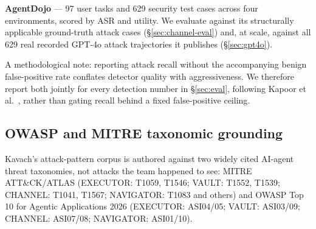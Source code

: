 \textbf{AgentDojo} \cite{debenedetti2024agentdojo} --- 97 user tasks and
629 security test cases across four environments, scored by ASR and
utility. We evaluate against its structurally applicable ground-truth
attack cases (\S\ref{sec:channel-eval}) and, at scale, against all 629 real
recorded GPT-4o attack trajectories it publishes (\S\ref{sec:gpt4o}).

A methodological note: reporting attack recall without the accompanying
benign false-positive rate conflates detector quality with aggressiveness.
We therefore report both jointly for every detection number in
\S\ref{sec:eval}, following Kapoor et al.~\cite{kapoor2024aiagents}, rather
than gating recall behind a fixed false-positive ceiling.

\subsection{OWASP and MITRE taxonomic grounding}

Kavach's attack-pattern corpus is authored against two widely cited
AI-agent threat taxonomies, not attacks the team happened to see: MITRE
ATT\&CK/ATLAS (EXECUTOR: T1059, T1546; VAULT: T1552, T1539; CHANNEL:
T1041, T1567; NAVIGATOR: T1083 and others) and OWASP Top 10 for Agentic
Applications 2026 (EXECUTOR: ASI04/05; VAULT: ASI03/09; CHANNEL: ASI07/08;
NAVIGATOR: ASI01/10).
